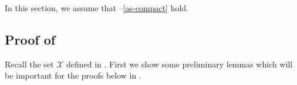 \documentclass[final]{amsart}
\numberwithin{thm}{section}
\numberwithin{equation}{section}
\newcommand{\X}{\mathcal{X}}
\begin{document}
In this section, we assume that --\ref{as-compact} hold.





















     


\subsection{Proof of }
Recall the set $\X$ defined in . First we show some preliminary lemmas which will be important for the proofs below in .
\end{document}
